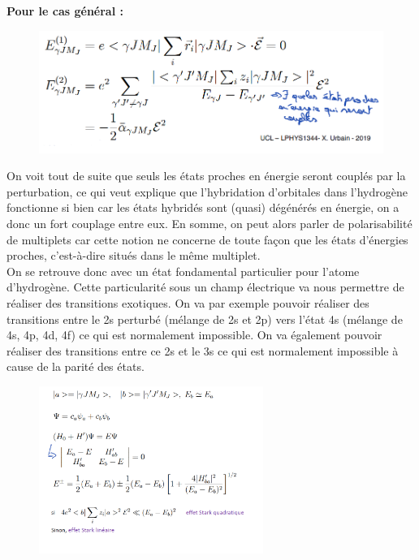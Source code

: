 \textbf{Pour le cas général :}\\

\begin{figure}[H]
    \centering
    \includegraphics[scale=0.8]{Images2/correcordre.PNG}
\end{figure}

On voit tout de suite que seuls les états proches en énergie seront couplés par la perturbation, ce qui veut explique que l'hybridation d'orbitales dans l'hydrogène fonctionne si bien car les états hybridés sont (quasi) dégénérés en énergie, on a donc un fort couplage entre eux. En somme, on peut alors parler de polarisabilité de multiplets car cette notion ne concerne de toute façon que les états d'énergies proches, c'est-à-dire situés dans le même multiplet.\\

On se retrouve donc avec un état fondamental particulier pour l'atome d'hydrogène. Cette particularité sous un champ électrique va nous permettre de réaliser des transitions exotiques. On va par exemple pouvoir réaliser des transitions entre le 2s perturbé (mélange de 2s et 2p) vers l'état 4s (mélange de 4s, 4p, 4d, 4f) ce qui est normalement impossible. On va également pouvoir réaliser des transitions entre ce 2s et le 3s ce qui est normalement impossible à cause de la parité des états.\\

\begin{figure}[H]
    \centering
    \includegraphics[width=0.65\textwidth]{Images2/EffetStark.PNG}
\end{figure}

